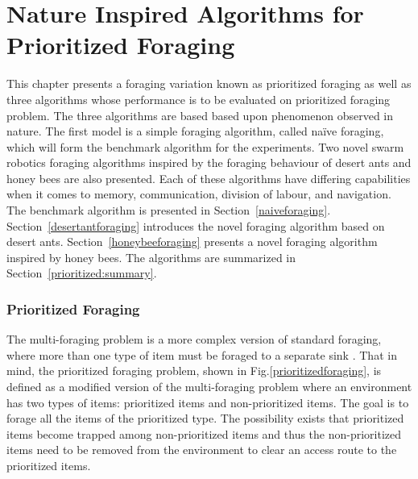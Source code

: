 
\chapter{Nature Inspired Algorithms for Prioritized Foraging}
\label{chap:third}


This chapter presents a foraging variation known as prioritized foraging as well as three algorithms whose performance is to be evaluated on prioritized foraging problem. The three algorithms are based based upon phenomenon observed in nature. The first model is a simple foraging algorithm, called na\"ive foraging, which will form the benchmark algorithm for the experiments. Two novel swarm robotics foraging algorithms inspired by the foraging behaviour of desert ants and honey bees are also presented. Each of these algorithms have differing capabilities when it comes to memory, communication, division of labour, and navigation. The benchmark algorithm is presented in Section~\ref{naiveforaging}. Section~\ref{desertantforaging} introduces the novel foraging algorithm based on desert ants. Section~\ref{honeybeeforaging} presents a novel foraging algorithm inspired by honey bees. The algorithms are summarized in Section~\ref{prioritized:summary}.

\subsection{Prioritized Foraging}
\label{sec:second:prioritizedforaging}


The multi-foraging problem is a more complex version of standard foraging, where more than one type of item must be foraged to a separate sink \cite{balch1999impact}. That in mind, the prioritized foraging problem, shown in Fig.\ref{prioritizedforaging}, is defined as a modified version of the multi-foraging problem where an environment has two types of items: prioritized items and non-prioritized items. The goal is to forage all the items of the prioritized type. The possibility exists that prioritized items become trapped among non-prioritized items and thus the non-prioritized items need to be removed from the environment to clear an access route to the prioritized items. 

